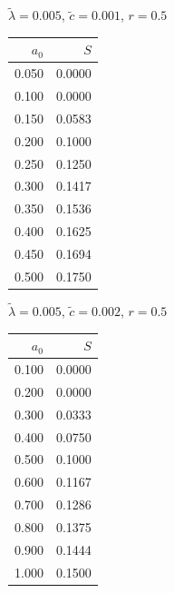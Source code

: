 \documentclass[11pt,a4paper]{article}
\begin{document}
\begin{minipage}[t]{\textwidth}
    \begin{minipage}[t]{0.32\textwidth}
        \footnotesize
        \begin{flushleft}$\tilde{\lambda}=0.005$, $\tilde{c}=0.001$, $r=0.5$\end{flushleft}
        \begin{tabular}[t]{rr}
            $a_0$ & $S$ \\
            \hline
             0.050 & 0.0000 \\
             0.100 & 0.0000 \\
             0.150 & 0.0583 \\
             0.200 & 0.1000 \\
             0.250 & 0.1250 \\
             0.300 & 0.1417 \\
             0.350 & 0.1536 \\
             0.400 & 0.1625 \\
             0.450 & 0.1694 \\
             0.500 & 0.1750 \\
        \end{tabular}
    \end{minipage}
    \begin{minipage}[t]{0.32\textwidth}
        \footnotesize
        \begin{flushleft}$\tilde{\lambda}=0.005$, $\tilde{c}=0.002$, $r=0.5$\end{flushleft}
        \begin{tabular}[t]{rr}
            $a_0$ & $S$ \\
            \hline
             0.100 & 0.0000 \\
             0.200 & 0.0000 \\
             0.300 & 0.0333 \\
             0.400 & 0.0750 \\
             0.500 & 0.1000 \\
             0.600 & 0.1167 \\
             0.700 & 0.1286 \\
             0.800 & 0.1375 \\
             0.900 & 0.1444 \\
             1.000 & 0.1500 \\
        \end{tabular}
    \end{minipage}
    \begin{minipage}[t]{0.32\textwidth}

\end{minipage}
\end{minipage}
\end{document}
